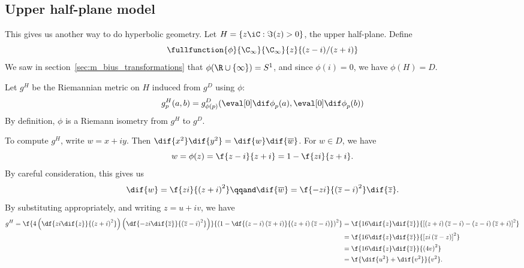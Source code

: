
\subsection{Upper half-plane model} %
\label{sub:upper_half_plane_model}

This gives us another way to do hyperbolic geometry. Let $H=\{z\iC: \Im(z)>0\}$, the upper half-plane. Define
\begin{equation*}
	\fullfunction{\varphi}{\C_\infty}{\C_\infty}{z}{(z-i)/(z+i)}
\end{equation*}
We saw in section~\ref{sec:m_bius_transformations} that $\phi(\R\cup\{\infty\}) = S^1$, and since $\phi(i)=0$, we have $\phi(H)=D$.

\begin{definition}
	Let $g^H$ be the Riemannian metric on $H$ induced from $g^D$ using $\phi$:
	\begin{equation*}
		g_\pp^H(\va,\vb) = g^D_{\phi(\pp)}(\ddif{\phi}{\pp}(\va), \ddif{\phi}{\pp}(\vb))
	\end{equation*}
	By definition, $\phi$ is a Riemann isometry from $g^H$ to $g^D$.
\end{definition}

To compute $g^H$, write $w=x+iy$. Then $\dif{x^2} \dif{y^2} = \dif{w} \dif{\wbar}$. For $w\in D$, we have
\begin{equation*}
	w=\phi(z) = \f{z-i}{z+i} = 1-\f{zi}{z+i}.
\end{equation*}
By careful consideration, this gives us
\begin{equation*}
	\dif{w} = \f{zi}{\left( z+i \right)^2} \qqand
	\dif{\wbar} = \f{-zi}{\left( \zbar-i \right)^2} \dif{\zbar}.
\end{equation*}
By substituting appropriately, and writing $z=u+iv$, we have
\begin{align*}
	g^H
	= \f{4\left( \df{zi \dif{z}}{\left( z+i \right)^2} \right) \left( \df{-zi \dif{\zbar}}{\left( \zbar-i \right)^2} \right)}{\left( 1-\df{\left( z-i \right)\left( \zbar+i \right)}{\left( z+i \right)\left( \zbar-i \right)} \right)^2}
	&= \f{16 \dif{z} \dif{\zbar}}{\left[ \left( z+i \right)\left( \zbar-i \right) - \left( z-i \right)\left( \zbar+i \right) \right]^2} \\
	&= \f{16 \dif{z} \dif{\zbar}}{\left[ zi\left( \zbar-z \right) \right]^2} \\
	&= \f{16 \dif{z} \dif{\zbar}}{\left( 4v \right)^2} \\
	&= \f{\dif{u^2} + \dif{v^2}}{v^2}.
\end{align*}

